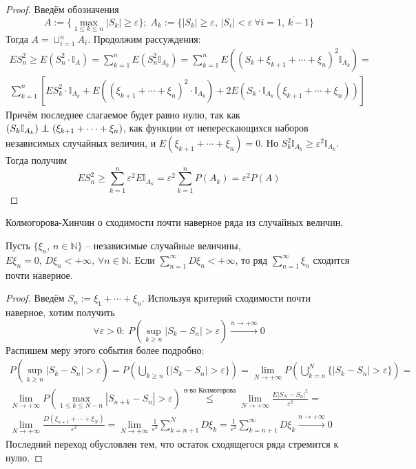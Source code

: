 \begin{proof}
	Введём обозначения
	\[A := \{\max_{1 \leq k \leq n} |S_k| \geq \varepsilon\};\; A_k := \{|S_k| \geq \varepsilon,\, |S_i| < \varepsilon \: \forall i = \overline{1,\,k-1}\}\]
	Тогда $A = \sqcup_{i = 1}^n A_i$. Продолжим рассуждения:
	\begin{align*}
		ES_n^2 \geq E(S_n^2 \cdot\mathbb{I}_A) = \sum_{k = 1}^n E(S_n^2\mathbb{I}_{A_k}) = \sum_{k = 1}^n E((S_k + \xi_{k + 1} + \cdots + \xi_n)^2\mathbb{I}_{A_k}) = \\
		\sum_{k = 1}^n \left[ES_k^2\cdot\mathbb{I}_{A_k} + E\left((\xi_{k + 1} + \cdots + \xi_n)^2\cdot\mathbb{I}_{A_k}\right) + 2E(S_k\cdot\mathbb{I}_{A_k}(\xi_{k + 1} + \cdots + \xi_n)) \right]
	\end{align*}
	Причём последнее слагаемое будет равно нулю, так как $(S_k\mathbb{I}_{A_k}) \independent (\xi_{k + 1} + \cdots + \xi_n)$, как функции от неперескающихся наборов независимых случайных величин, и $E(\xi_{k + 1} + \cdots + \xi_n) = 0$. Но $S_k^2\mathbb{I}_{A_k} \geq \varepsilon^2\mathbb{I}_{A_k}$. Тогда получим
	\[ES_n^2 \geq \sum_{k = 1}^n\varepsilon^2E\mathbb{I}_{A_k} = \varepsilon^2 \sum_{k = 1}^n P(A_k) = \varepsilon^2 P(A)\]
\end{proof}

\begin{theorem}
	Колмогорова-Хинчин о сходимости почти наверное ряда из случайных величин.

	Пусть $\{\xi_n,\, n \in \mathbb{N}\}$ -- независимые случайные величины, $E\xi_n = 0,\, D\xi_n < +\infty,\, \forall n \in \mathbb{N}$. Если $\sum_{n = 1}^\infty D\xi_n < +\infty$, то ряд $\sum_{n = 1}^\infty \xi_n$ сходится почти наверное.
\end{theorem}

\begin{proof}
	Введём $S_n := \xi_1 + \cdots + \xi_n$. Используя критерий сходимости почти наверное, хотим получить
	\[\forall \varepsilon > 0:\: P\left(\sup_{k \geq n} |S_k - S_n| > \varepsilon\right) \stackrel{n \to +\infty}{\to} 0\]
	Распишем меру этого события более подробно:
	\begin{align*}
		P\left(\sup_{k \geq n} |S_k - S_n| > \varepsilon\right) = P\left(\bigcup_{k \geq n}\{|S_k - S_n| > \varepsilon\}\right) = \lim_{N \to +\infty} P\left(\bigcup_{k = n}^N \{|S_k - S_n| > \varepsilon\}\right) = \\
		\lim_{N \to +\infty} P\left(\max_{1 \leq k \leq N - n} |S_{n + k} - S_n| > \varepsilon\right) \stackrel{\text{н-во Колмогорова}}{\leq} \lim_{N \to +\infty} \frac{E|S_N - S_n|^2}{\varepsilon^2} =             \\
		\lim_{N \to +\infty} \frac{D(\xi_{n + 1} + \cdots + \xi_N)}{\varepsilon^2} = \lim_{N \to +\infty} \frac{1}{\varepsilon^2}\sum_{k = n + 1}^N D\xi_k = \frac{1}{\varepsilon^2} \sum_{k = n + 1}^\infty D\xi_k \stackrel{n \to +\infty}{\to} 0
	\end{align*}
	Последний переход обусловлен тем, что остаток сходящегося ряда стремится к нулю.
\end{proof}
